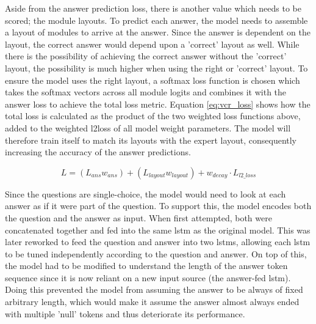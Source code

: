 Aside from the answer prediction loss, there is another value which needs to be scored; the module layouts.
To predict each answer, the model needs to assemble a layout of modules to arrive at the answer.
Since the answer is dependent on the layout, the correct answer would depend upon a 'correct' layout as well.
While there is the possibility of achieving the correct answer without the 'correct' layout, the possibility is much higher when using the right or 'correct' layout.
To ensure the model uses the right layout, a \gls{softmax} loss function is chosen which takes the softmax vectors across all module \glspl{logit} and combines it with the answer loss to achieve the total loss metric.
Equation \ref{eq:vcr_loss} shows how the total loss is calculated as the product of the two weighted loss functions above, added to the weighted \gls{l2loss} of all model weight parameters.
The model will therefore train itself to match its layouts with the expert layout, consequently increasing the accuracy of the answer predictions.

\begin{equation}\label{eq:vcr_loss}
    L=(L_{ans}w_{ans}) + (L_{layout}w_{layout}) + w_{decay} \cdot L_{l2\_loss}
\end{equation}

Since the questions are single-choice, the model would need to look at each answer as if it were part of the question.
To support this, the model encodes both the question and the answer as input.
When first attempted, both were concatenated together and fed into the same \gls{lstm} as the original model.
This was later reworked to feed the question and answer into two \glspl{lstm}, allowing each \gls{lstm} to be tuned independently according to the question and answer.
On top of this, the model had to be modified to understand the length of the answer token sequence since it is now reliant on a new input source (the answer-fed \gls{lstm}).
Doing this prevented the model from assuming the answer to be always of fixed arbitrary length, which would make it assume the answer almost always ended with multiple 'null' tokens and thus deteriorate its performance.

